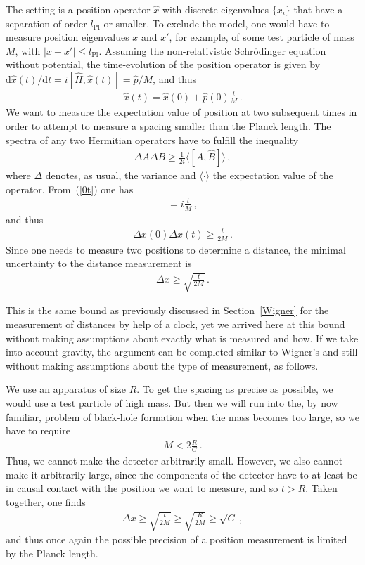\documentclass{article}
\def\beqn{\begin{eqnarray}}
\def\eeqn{\end{eqnarray}}
\begin{document}
The setting is a position operator $\hat x$ with discrete eigenvalues
$\{x_i\}$ that have a separation of order $l_{\mathrm{Pl}}$ or smaller. To exclude the model, one
would have to measure position eigenvalues $x$ and $x'$, for example, of some
test particle of mass $M$, with $|x-x'| \leq l_{\mathrm{Pl}}$. Assuming the non-relativistic
Schr{\"o}dinger equation without potential, the time-evolution of the position operator is 
given by $\mathrm{d}\hat x(t)/\mathrm{d}t = i [ \hat H, \hat x(t)] = \hat p/M$, and thus
\beqn
\hat x(t) = \hat x(0) + \hat p(0) \frac{t}{M} \,. \label{0t}
\eeqn
We want to measure the expectation value of position at two subsequent times in order
to attempt to measure a spacing smaller than the Planck length. The spectra of any two 
Hermitian operators have to fulfill the inequality 
\beqn
\Delta A \Delta B \geq \frac{1}{2 i} \langle [ \hat A, \hat B] \rangle \,,
\eeqn
where $\Delta$ denotes, as usual, the variance and $\langle \cdot \rangle$ the expectation value of
the operator. From~(\ref{0t}) one has
\beqn
[\hat x(0), \hat x(t) ] = i\frac{t}{M} \,,
\eeqn
and thus
\beqn
\Delta x(0) \Delta x(t) \geq \frac{t}{2M} \,.
\eeqn
Since one needs to measure two positions to determine a distance, the minimal uncertainty
to the distance measurement is 
\beqn
\Delta x \geq \sqrt{\frac{t}{2M}} \label{deltasqrt} \,.
\eeqn

This is the same bound as previously discussed in Section~\ref{Wigner} for the measurement of distances by
help of a clock, yet we arrived here at this bound without making assumptions about exactly
what is measured and how. If we take into account gravity, the argument can be completed similar to
Wigner's and still without making assumptions about the type of measurement, as follows.  

We use an apparatus 
of size $R$. To get the spacing as precise as possible, 
we would use a test particle of high mass. But then we will run into the, by now familiar,
problem of black-hole formation when the mass becomes too large, so we have to require
\beqn 
M < 2 \frac{R}{G} \,.
\eeqn
Thus, we cannot make the detector arbitrarily small. However, we also cannot make it arbitrarily
large, since the components of the detector have to at least be in causal
contact with the position we want to measure, and so $t > R$. Taken together, one
finds
\beqn
\Delta x \geq \sqrt{\frac{t}{2M}} \geq \sqrt{\frac{R}{2M}} \geq \sqrt{G} \,, 
\eeqn
and thus once again the possible precision of a position measurement is limited by
the Planck length.
\end{document}
